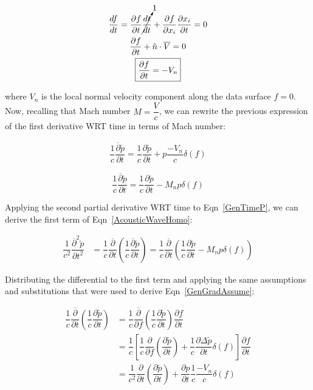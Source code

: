 \documentclass[]{aiaa-tc}%
\begin{document}
\begin{gather*}
\dfrac{df}{dt}
= \dfrac{\partial f}{\partial t} \cancelto{1}{\dfrac{dt}{dt}}
  + \dfrac{\partial f}{\partial x_i} \dfrac{\partial x_i}{\partial t} = 0 \\
\dfrac{\partial f}{\partial t} + \hat{n} \cdot \overline{V} = 0 \\
\boxed{\dfrac{\partial f}{\partial t} = -V_n}
\end{gather*}

\noindent where $V_n$ is the local normal velocity component along the data surface $f=0$. Now, recalling that Mach number $M = \dfrac{V}{c}$, we can rewrite the previous expression of the first derivative WRT time in terms of Mach number:






\begin{align*}
\dfrac{1}{c}\dfrac{\overline{\partial}\widetilde{p}}{\partial t}
= \dfrac{1}{c}\dfrac{\partial\widetilde{p}}{\partial t}
    + p \dfrac{-V_n}{c} \delta(f)
\end{align*}

\begin{equation} \label{GenTimeP}
\dfrac{1}{c}\dfrac{\overline{\partial}\widetilde{p}}{\partial t}
= \dfrac{1}{c}\dfrac{\partial\widetilde{p}}{\partial t}
    - M_n p\delta(f)
\end{equation}

Applying the second partial derivative WRT time to Eqn~\ref{GenTimeP}, we can derive the first term of Eqn~\ref{AcousticWaveHomo}:

\begin{align*}
\dfrac{1}{c^2}\dfrac{\overline{\partial}^2\widetilde{p}}{\partial t^2}
    &= \dfrac{1}{c}\dfrac{\overline{\partial}}{\partial t} \left(
    \dfrac{1}{c}\dfrac{\overline{\partial}\widetilde{p}}{\partial t} \right)
= \dfrac{1}{c}\dfrac{\overline{\partial}}{\partial t} \left(
\dfrac{1}{c}\dfrac{\partial\widetilde{p}}{\partial t}
    - M_n p\delta(f) \right)
\end{align*}

\noindent Distributing the differential to the first term and applying the same assumptions and substitutions that were used to derive Eqn~\ref{GenGradAssume}:

\begin{align*}
\dfrac{1}{c}\dfrac{\overline{\partial}}{\partial t}
    \left( \dfrac{1}{c}\dfrac{\partial\widetilde{p}}{\partial t} \right)
    &= \dfrac{1}{c}\dfrac{\overline{\partial}}{\partial f}
    \left( \dfrac{1}{c}\dfrac{\partial\widetilde{p}}{\partial t} \right)
    \dfrac{\partial f}{\partial t} \\
&= \dfrac{1}{c} \left[
    \dfrac{1}{c} \dfrac{\partial}{\partial f} \left(
    \dfrac{\partial\widetilde{p}}{\partial t} \right)
    + \dfrac{1}{c} \dfrac{\partial\Delta\widetilde{p}}{\partial t} \delta(f)
    \right] \dfrac{\partial f}{\partial t} \\
&=  \dfrac{1}{c^2} \dfrac{\partial}{\partial t} \left(
    \dfrac{\partial\widetilde{p}}{\partial t} \right)
    + \dfrac{\partial p}{\partial t} \dfrac{1}{c}\dfrac{-V_n}{c} \delta(f)
\end{align*}
\end{document}
